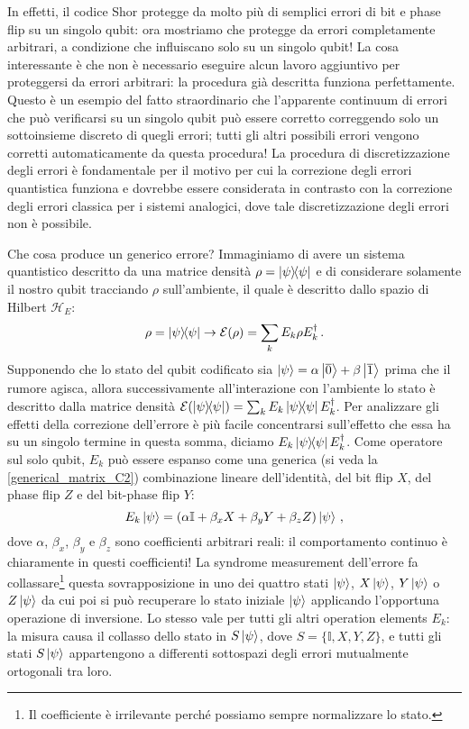 \noindent In effetti, il codice Shor protegge da molto più di semplici errori di bit e phase flip su un singolo qubit: ora mostriamo che protegge da errori completamente arbitrari, a condizione che influiscano solo su un singolo qubit! La cosa interessante è che non è necessario eseguire alcun lavoro aggiuntivo per proteggersi da errori arbitrari: la procedura già descritta funziona perfettamente. Questo è un esempio del fatto straordinario che l'apparente continuum di errori che può verificarsi su un singolo qubit può essere corretto correggendo solo un sottoinsieme discreto di quegli errori; tutti gli altri possibili errori vengono corretti automaticamente da questa procedura! La procedura di discretizzazione degli errori è fondamentale per il motivo per cui la correzione degli errori quantistica funziona e dovrebbe essere considerata in contrasto con la correzione degli errori classica per i sistemi analogici, dove tale discretizzazione degli errori non è possibile. 

\noindent Che cosa produce un generico errore? Immaginiamo di avere un sistema quantistico descritto da una matrice densità $\rho=\op{\psi}{\psi}$ e di considerare solamente il nostro qubit tracciando $\rho$ sull'ambiente, il quale è descritto dallo spazio di Hilbert $\mathcal{H}_E$:
\begin{equation*}
    \rho =\op{\psi}{\psi} \rightarrow \mathcal{E}(\rho) = \sum_k E_k \rho E_k^\dagger \, .
\end{equation*}
Supponendo che lo stato del qubit codificato sia $\ket \psi = \alpha\ket{\overline 0} + \beta\ket{\overline 1}$ prima che il rumore agisca, allora successivamente all'interazione con l'ambiente lo stato è descritto dalla matrice densità $\mathcal{E}(\op{\psi}{\psi}) = \sum_k E_k \op{\psi}{\psi} E_k^\dagger$. Per analizzare gli effetti della correzione dell'errore è più facile concentrarsi sull'effetto che essa ha su un singolo termine in questa somma, diciamo $E_k \op{\psi}{\psi} E_k^\dagger$. Come operatore sul solo qubit, $E_k$ può essere espanso come una generica (si veda la \eqref{generical_matrix_C2}) combinazione lineare dell'identità, del bit flip $X$, del phase flip $Z$ e del bit-phase flip $Y$:
\begin{equation*}
    E_k\ket \psi = \left(\alpha \mathbb{I} +\beta_x X + \beta_y Y + \beta_z Z\right)\ket \psi \, ,
\end{equation*}
dove $\alpha$, $\beta_x$, $\beta_y$ e $\beta_z$ sono coefficienti arbitrari reali: il comportamento continuo è chiaramente in questi coefficienti!
La syndrome measurement dell'errore fa collassare\footnote{Il coefficiente è irrilevante perché possiamo sempre normalizzare lo stato.} questa sovrapposizione in uno dei quattro stati $\ket \psi$, $X\ket\psi$, $Y\ket\psi$ o $Z\ket\psi$ da cui poi si può recuperare lo stato iniziale $\ket{\psi}$ applicando l'opportuna operazione di inversione. Lo stesso vale per tutti gli altri operation elements $E_k$: la misura causa il collasso dello stato in $S\ket{\psi}$, dove $S = \{ \mathbb{I}, X, Y, Z \}$, e tutti gli stati $S\ket{\psi}$ appartengono a differenti sottospazi degli errori mutualmente ortogonali tra loro.

